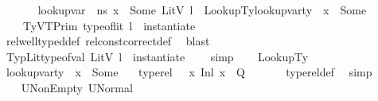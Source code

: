 \begin{isabellebody}
\ {\isasymtau}\ \isanewline
\ \ \ \ {\isachardoublequoteopen}lookup{\isacharunderscore}{\kern0pt}var\ {\isasymLambda}\ ns\ x\ {\isacharequal}{\kern0pt}\ Some\ {\isacharparenleft}{\kern0pt}LitV\ l{\isacharparenright}{\kern0pt}{\isachardoublequoteclose}\ \ LookupTy{\isacharcolon}{\kern0pt}{\isachardoublequoteopen}lookup{\isacharunderscore}{\kern0pt}var{\isacharunderscore}{\kern0pt}ty\ {\isasymLambda}\ x\ {\isacharequal}{\kern0pt}\ Some\ {\isasymtau}{\isachardoublequoteclose}\ \ \isanewline
\ \ \ \ TyV{\isacharcolon}{\kern0pt}{\isachardoublequoteopen}TPrim\ {\isacharparenleft}{\kern0pt}type{\isacharunderscore}{\kern0pt}of{\isacharunderscore}{\kern0pt}lit\ l{\isacharparenright}{\kern0pt}\ {\isacharequal}{\kern0pt}\ instantiate\ {\isasymOmega}\ {\isasymtau}{\isachardoublequoteclose}\isanewline
\ \ \ \ \isamarkupfalse%
\ rel{\isacharunderscore}{\kern0pt}well{\isacharunderscore}{\kern0pt}typed{\isacharunderscore}{\kern0pt}def\ rel{\isacharunderscore}{\kern0pt}const{\isacharunderscore}{\kern0pt}correct{\isacharunderscore}{\kern0pt}def\ \isamarkupfalse%
\ blast\ \ \isanewline
\ \ \isamarkupfalse%
\ TypLit{\isacharcolon}{\kern0pt}{\isachardoublequoteopen}type{\isacharunderscore}{\kern0pt}of{\isacharunderscore}{\kern0pt}val\ {\isacharparenleft}{\kern0pt}LitV\ l{\isacharparenright}{\kern0pt}\ {\isacharequal}{\kern0pt}\ instantiate\ {\isasymOmega}\ {\isasymtau}{\isachardoublequoteclose}\ \isamarkupfalse%
\ simp\isanewline
\ \ \isamarkupfalse%
\ LookupTy\ \isamarkupfalse%
\ {\isachardoublequoteopen}lookup{\isacharunderscore}{\kern0pt}var{\isacharunderscore}{\kern0pt}ty\ {\isasymLambda}{\isacharprime}{\kern0pt}\ x{}\ {\isacharequal}{\kern0pt}\ Some\ {\isasymtau}{\isachardoublequoteclose}\ \isamarkupfalse%
\ {\isacartoucheopen}type{\isacharunderscore}{\kern0pt}rel\ {\isasymLambda}\ {\isasymLambda}{\isacharprime}{\kern0pt}\ {\isacharparenleft}{\kern0pt}{\isacharparenleft}{\kern0pt}x{\isacharcomma}{\kern0pt}\ Inl\ x{}{\isacharparenright}{\kern0pt}\ {\isacharhash}{\kern0pt}\ Q{\isacharparenright}{\kern0pt}{\isacartoucheclose}\ \isanewline
\ \ \ \ \isamarkupfalse%
\ type{\isacharunderscore}{\kern0pt}rel{\isacharunderscore}{\kern0pt}def\ \isamarkupfalse%
\ simp\ \ \ \ \isanewline
\ \ \isamarkupfalse%
\ U{}NonEmpty{\isacharcolon}{\kern0pt}\ {\isachardoublequoteopen}{\isacharquery}{\kern0pt}U{}Normal\ {\isasymnoteq}\ {\isacharbraceleft}{\kern0pt}{\isacharbraceright}{\kern0pt}{\isachardoublequoteclose}\ \isamarkupfalse%

\end{isabellebody}
